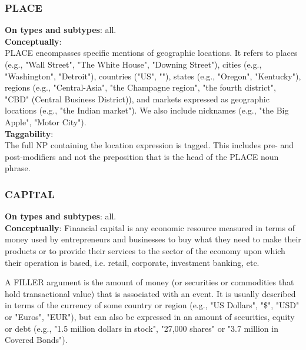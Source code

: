 \vspace{0.5cm}

\subsubsection{PLACE}

\justify
\noindent\textbf{On types and subtypes}: all.\\[6pt]
\noindent\textbf{Conceptually}:\\
PLACE encompasses specific mentions of geographic locations.
It refers to places (e.g., "Wall Street", "The White House", "Downing Street"), cities (e.g., "Washington", "Detroit"), countries ("US", ""), states (e.g., "Oregon", "Kentucky"), regions (e.g., "Central-Asia", "the Champagne region", "the fourth district", "CBD" (Central Business District)), and markets expressed as geographic locations (e.g., "the Indian market"). We also include nicknames (e.g., "the Big Apple", "Motor City").\\

\noindent\textbf{Taggability}:\\
The full NP containing the location expression is tagged.
This includes pre- and post-modifiers and not the preposition that is the head of the PLACE noun phrase.


\vspace{0.5cm}

\subsubsection{CAPITAL}

\justify
\noindent\textbf{On types and subtypes}: all.\\[6pt]
\noindent\textbf{Conceptually}:
Financial capital is any economic resource measured in terms of money used by entrepreneurs and businesses to buy what they need to make their products or to provide their services to the sector of the economy upon which their operation is based, i.e. retail, corporate, investment banking, etc.

A  FILLER argument is the amount of money (or securities or commodities that hold transactional value) that is associated with an event. It is usually described in terms of the currency of some country or region (e.g., "US Dollars", "\$", "USD" or "Euros", "EUR"), but can also be expressed in an amount of securities, equity or debt (e.g., "1.5 million dollars in stock", "27,000 shares" or "3.7 million in Covered Bonds").\\

